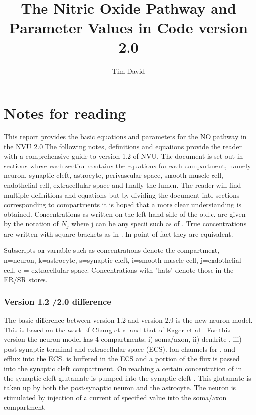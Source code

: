 \documentclass[fleqn]{report}
\numberwithin{equation}{section}
\numberwithin{equation}{section}
\newcommand{\Na}{\text{Na$^{+}$}}
\newcommand{\K}{\text{K$^+$}}
\newcommand{\Ca}{\text{Ca$^{2+}$}}
\newcommand{\Can}{\text{[Ca$^{2+}]_n$}}
\begin{document}
\author{Tim David}
\title{The Nitric Oxide Pathway and Parameter Values in Code version 2.0 }
\maketitle
\newpage
\linenumbers
\listoftodos 
%
%
%
%
%
\chapter{Notes for reading}
This report provides the basic equations and parameters for the NO pathway in the NVU 2.0 
The following notes, definitions and equations provide the reader with a comprehensive guide to version 1.2 of NVU. The document is set out in sections where each section contains the equations for each compartment, namely neuron, synaptic cleft, astrocyte, perivascular space, smooth muscle cell, endothelial cell, extracellular space and finally the lumen. The reader will find multiple definitions and equations but by dividing the document into sections corresponding to compartments it is hoped that a more clear understanding is obtained.
Concentrations as written on the left-hand-side of the o.d.e. are given by the notation of $N_j$ where j can be any specii such as \Na of \Ca. True concentrations are written with square brackets as in \Can . In point of fact they are equivalent.

Subscripts on variable such as concentrations denote the compartment, n=neuron, k=astrocyte, s=synaptic cleft, i=smooth muscle cell, j=endothelial cell, e = extracellular space.  Concentrations with "hats" denote those in the ER/SR stores. 
\subsection{Version 1.2 /2.0 difference}
 The basic difference between version 1.2 and version 2.0 is the new neuron model. This is based on the work of Chang et al \cite{Chang2013}	and that of Kager et al \cite{Kager2000a}. For this version the neuron model has  4 compartments; i) soma/axon, ii) dendrite , iii) post synaptic terminal and extracellular space (ECS). Ion channels for \Na, and \K efflux into the ECS.  \K is buffered in the ECS and a portion of the \K flux is passed into the synaptic cleft compartment. On reaching a certain concentration of \K in the synaptic cleft  glutamate is pumped into the synaptic cleft . This glutamate is taken up by both the post-synaptic neuron and the astrocyte. The neuron is stimulated by injection of a current of specified value into the soma/axon compartment. 
 
\end{document}
